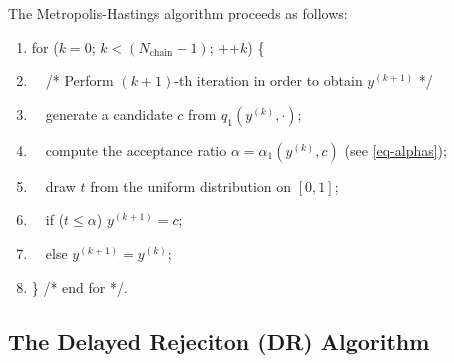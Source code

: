 The Metropolis-Hastings algorithm proceeds as follows:
\begin{enumerate}
\item for ($k=0$; $k < (N_{\mbox{chain}}-1)$; ++$k$) \{
\item $\quad$/* Perform $(k+1)$-th iteration in order to obtain $y^{(k+1)}$ */
\item $\quad$generate a candidate $c$ from $q_1(y^{(k)},\cdot)$;
\item $\quad$compute the acceptance ratio $\alpha=\alpha_1(y^{(k)},c)$ (see \eqref{eq-alphas});
\item $\quad$draw $t$ from the uniform distribution on $[0,1]$;
\item $\quad$if ($t\leqslant \alpha$) $y^{(k+1)}=c$;
\item $\quad$else $y^{(k+1)}=y^{(k)}$;
\item \} /* end for */.
\end{enumerate}

\subsection{The Delayed Rejeciton (DR) Algorithm}%

